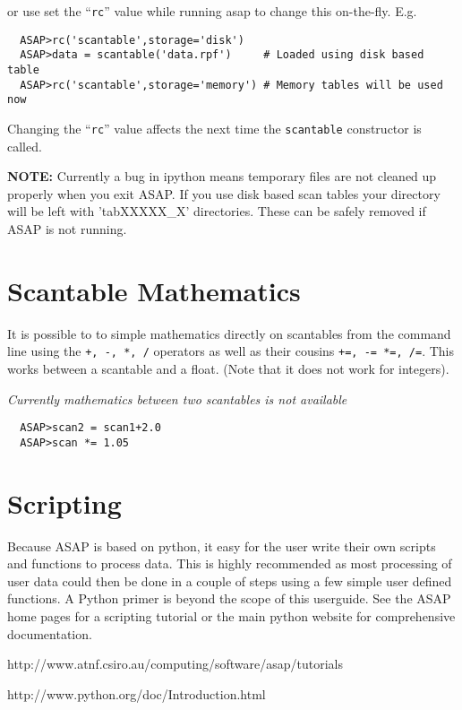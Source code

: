 \documentclass[11pt]{article}
\newcommand{\cmd}[1]{{\tt #1}}
\begin{document}
or use set the ``\cmd{rc}'' value while running asap to change this
on-the-fly. E.g.
\begin{verbatim}
  ASAP>rc('scantable',storage='disk')
  ASAP>data = scantable('data.rpf')     # Loaded using disk based table
  ASAP>rc('scantable',storage='memory') # Memory tables will be used now
\end{verbatim}

Changing the ``\cmd{rc}'' value affects the next time the
\cmd{scantable} constructor is called.

{\bf NOTE: } Currently a bug in ipython means temporary files are not
cleaned up properly when you exit ASAP. If you use disk based scan
tables your directory will be left with 'tabXXXXX\_X' directories. These can
be safely removed if ASAP is not running.

\section{Scantable Mathematics}

It is possible to to simple mathematics
directly on scantables from the command line using the \cmd{+, -, *,
/} operators as well as their cousins \cmd{+=, -= *=, /=}. This works
between a scantable and a float. (Note that it does
not work for integers).

{\em Currently mathematics between two scantables is not available }

\begin{verbatim}
  ASAP>scan2 = scan1+2.0
  ASAP>scan *= 1.05
\end{verbatim}

\section{Scripting}

Because ASAP is based on python, it easy for the user
write their own scripts and functions to process data. This is highly
recommended as most processing of user data could then be done in a
couple of steps using a few simple user defined functions. A Python
primer is beyond the scope of this userguide. See the ASAP home pages
for a scripting tutorial or the main python website for comprehensive
documentation.

\hspace{1cm} http://www.atnf.csiro.au/computing/software/asap/tutorials

\hspace{1cm} http://www.python.org/doc/Introduction.html
\end{document}

